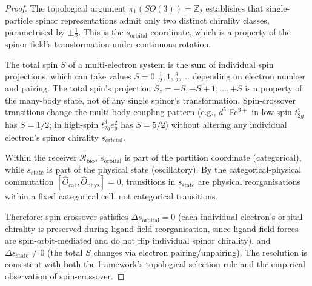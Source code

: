 \documentclass[11pt,twocolumn,a4paper]{article}
\theoremstyle{definition}
\theoremstyle{remark}
\newcommand{\Z}{\mathbb{Z}}
\newcommand{\Recv}{\mathcal{R}}
\begin{document}
\begin{proof}
The topological argument $\pi_1(SO(3)) = \Z_2$ \citep{nakahara2003} establishes that single-particle spinor representations admit only two distinct chirality classes, parametrised by $\pm\tfrac{1}{2}$. This is the $s_{\mathrm{orbital}}$ coordinate, which is a property of the spinor field's transformation under continuous rotation.

The total spin $S$ of a multi-electron system is the sum of individual spin projections, which can take values $S = 0, \tfrac{1}{2}, 1, \tfrac{3}{2}, \ldots$ depending on electron number and pairing. The total spin's projection $S_z = -S, -S+1, \ldots, +S$ is a property of the many-body state, not of any single spinor's transformation. Spin-crossover transitions change the multi-body coupling pattern (e.g., $d^5$ Fe$^{3+}$ in low-spin $t_{2g}^5$ has $S = 1/2$; in high-spin $t_{2g}^3 e_g^2$ has $S = 5/2$) without altering any individual electron's spinor chirality $s_{\mathrm{orbital}}$.

Within the receiver $\Recv_{\mathrm{bio}}$, $s_{\mathrm{orbital}}$ is part of the partition coordinate (categorical), while $s_{\mathrm{state}}$ is part of the physical state (oscillatory). By the categorical-physical commutation $[\hat{O}_{\mathrm{cat}}, \hat{O}_{\mathrm{phys}}] = 0$, transitions in $s_{\mathrm{state}}$ are physical reorganisations within a fixed categorical cell, not categorical transitions.

Therefore: spin-crossover satisfies $\Delta s_{\mathrm{orbital}} = 0$ (each individual electron's orbital chirality is preserved during ligand-field reorganisation, since ligand-field forces are spin-orbit-mediated and do not flip individual spinor chirality), and $\Delta s_{\mathrm{state}} \neq 0$ (the total $S$ changes via electron pairing/unpairing). The resolution is consistent with both the framework's topological selection rule and the empirical observation of spin-crossover.
\end{proof}
\end{document}
